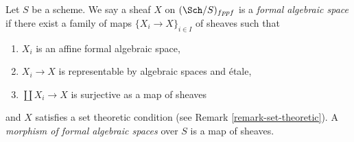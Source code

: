 \begin{definition}
\label{definition-formal-algebraic-space}
Let $S$ be a scheme. We say a sheaf $X$ on $(\Sch/S)_{fppf}$ is a
{\it formal algebraic space} if there exist a family of maps
$\{X_i \to X\}_{i \in I}$ of sheaves such that
\begin{enumerate}
\item $X_i$ is an affine formal algebraic space,
\item $X_i \to X$ is representable by algebraic spaces and \'etale,
\item $\coprod X_i \to X$ is surjective as a map of sheaves
\end{enumerate}
and $X$ satisfies a set theoretic condition
(see Remark \ref{remark-set-theoretic}). A
{\it morphism of formal algebraic spaces}
over $S$ is a map of sheaves.
\end{definition}